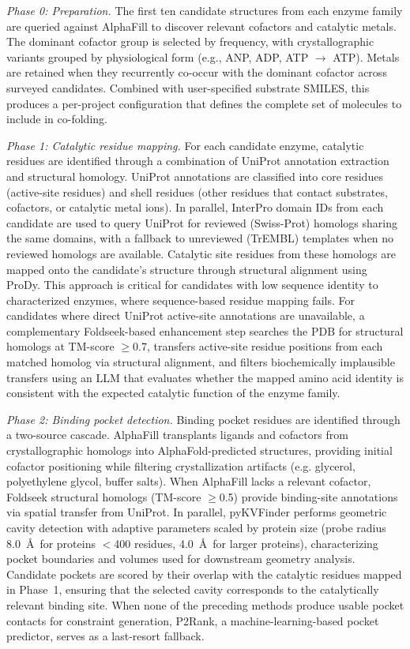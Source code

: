 \documentclass[12pt]{article}
\begin{document}
\textit{Phase 0: Preparation.} The first ten candidate structures from each enzyme family are queried against AlphaFill\cite{hekkelman2023alphafill} to discover relevant cofactors and catalytic metals. The dominant cofactor group is selected by frequency, with crystallographic variants grouped by physiological form (e.g., ANP, ADP, ATP $\rightarrow$ ATP). Metals are retained when they recurrently co-occur with the dominant cofactor across surveyed candidates. Combined with user-specified substrate SMILES, this produces a per-project configuration that defines the complete set of molecules to include in co-folding.

\textit{Phase 1: Catalytic residue mapping.} For each candidate enzyme, catalytic residues are identified through a combination of UniProt annotation extraction and structural homology. UniProt annotations are classified into core residues (active-site residues) and shell residues (other residues that contact substrates, cofactors, or catalytic metal ions). In parallel, InterPro domain IDs from each candidate are used to query UniProt for reviewed (Swiss-Prot) homologs sharing the same domains, with a fallback to unreviewed (TrEMBL) templates when no reviewed homologs are available. Catalytic site residues from these homologs are mapped onto the candidate's structure through structural alignment using ProDy\cite{bakan2011prody}. This approach is critical for candidates with low sequence identity to characterized enzymes, where sequence-based residue mapping fails. For candidates where direct UniProt active-site annotations are unavailable, a complementary Foldseek\cite{vankempen2024foldseek}-based enhancement step searches the PDB for structural homologs at TM-score $\geq$0.7, transfers active-site residue positions from each matched homolog via structural alignment, and filters biochemically implausible transfers using an LLM that evaluates whether the mapped amino acid identity is consistent with the expected catalytic function of the enzyme family.

\textit{Phase 2: Binding pocket detection.} Binding pocket residues are identified through a two-source cascade. AlphaFill transplants ligands and cofactors from crystallographic homologs into AlphaFold-predicted structures, providing initial cofactor positioning while filtering crystallization artifacts (e.g. glycerol, polyethylene glycol, buffer salts). When AlphaFill lacks a relevant cofactor, Foldseek structural homologs (TM-score $\geq$0.5) provide binding-site annotations via spatial transfer from UniProt. In parallel, pyKVFinder\cite{guerra2021pykvfinder} performs geometric cavity detection with adaptive parameters scaled by protein size (probe radius 8.0~\AA\ for proteins $<$400 residues, 4.0~\AA\ for larger proteins), characterizing pocket boundaries and volumes used for downstream geometry analysis. Candidate pockets are scored by their overlap with the catalytic residues mapped in Phase~1, ensuring that the selected cavity corresponds to the catalytically relevant binding site. When none of the preceding methods produce usable pocket contacts for constraint generation, P2Rank\cite{krivak2018p2rank}, a machine-learning-based pocket predictor, serves as a last-resort fallback.
\end{document}
